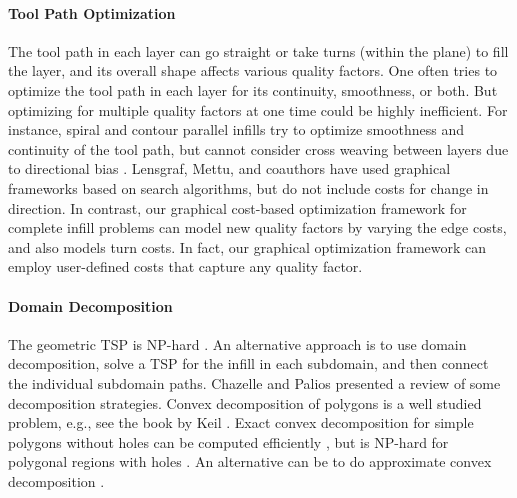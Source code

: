   \paragraph{Tool Path Optimization}\label{sec:optimization}
  The tool path in each layer can go straight or take turns (within the plane) to fill the layer, and its overall shape affects various quality factors.
  One often tries to optimize the tool path in each layer for its continuity, smoothness, or both.
  But optimizing for multiple quality factors at one time could be highly inefficient.
  For instance, spiral and contour parallel infills try to optimize smoothness and continuity of the tool path, but cannot consider cross weaving between layers due to directional bias \cite{GiRoSt2015}.
  Lensgraf, Mettu, and coauthors \cite{LeMe2016,LeMe2017,LeMe2018,YoLeFiClMe2020} have used graphical frameworks based on search algorithms, but do not include costs for change in direction.
  In contrast, our graphical cost-based optimization framework for complete infill problems can model new quality factors by varying the edge costs, and also models turn costs.
  In fact, our graphical optimization framework can employ user-defined costs that capture any quality factor.
  
  \paragraph{Domain Decomposition}\label{sec:domaindecomposition}
  The geometric TSP is NP-hard \cite{Pa1977}.
  An alternative approach is to use domain decomposition, solve a TSP for the infill in each subdomain, and then connect the individual subdomain paths. 
  Chazelle and Palios \cite{ChPa1994} presented a review of some decomposition strategies.
  Convex decomposition of polygons is a well studied problem, e.g., see the book by Keil \cite{Ke2000}. 
  Exact convex decomposition for simple polygons without holes can be computed efficiently \cite{ChDo1979,ChDo1985}, but is NP-hard for polygonal regions with holes \cite{AnMoEr1982}. 
  An alternative can be to do approximate convex decomposition \cite{LiAm2006}.
  
